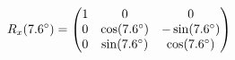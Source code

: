 \documentclass[preview]{standalone}
\begin{document}
\begin{align*}
\special{dvisvgm:raw <g id='unique000'>}R_x(7.6^\circ) = \begin{pmatrix} 1 & 0 & 0 \\ 0 & \cos(7.6^\circ) & -\sin(7.6^\circ) \\ 0 & \sin(7.6^\circ) & \cos(7.6^\circ) \end{pmatrix}\special{dvisvgm:raw </g>}
\end{align*}
\end{document}
